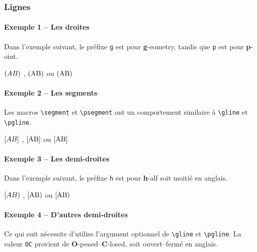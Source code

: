 \documentclass[12pt,a4paper]{article}
\begin{document}
\subsubsection{Lignes}

\paragraph{Exemple 1 -- Les droites}

Dans l'exemple suivant, le préfixe \verb+g+ est pour \textbf{g}-eometry, tandis que \verb+p+ est pour \textbf{p}-oint.

\begin{latexex}
$\gline{A}{B}$ ,
$\gline{\pt{A}}{\pt{B}}$ ou
$\pgline{A}{B}$
\end{latexex}




\paragraph{Exemple 2 -- Les segments}

Les macros \verb+\segment+ et \verb+\psegment+ ont un comportement similaire à \verb+\gline+ et \verb+\pgline+.

\begin{latexex}
$\segment{A}{B}$ ,
$\segment{\pt{A}}{\pt{B}}$ ou
$\psegment{A}{B}$
\end{latexex}




\paragraph{Exemple 3 -- Les demi-droites}

Dans l'exemple suivant, le préfixe \verb+h+ est pour \textbf{h}-alf soit moitié en anglais.

\begin{latexex}
$\hgline{A}{B}$ ,
$\hgline{\pt{A}}{\pt{B}}$ ou
$\phgline{A}{B}$
\end{latexex}




\paragraph{Exemple 4 -- D'autres demi-droites}

Ce qui suit nécessite d'utilise l'argument optionnel de \verb+\gline+ et \verb+\pgline+. La valeur \verb+OC+ provient de \textbf{O}-pened--\textbf{C}-losed, soit ouvert--fermé en anglais.
\end{document}

